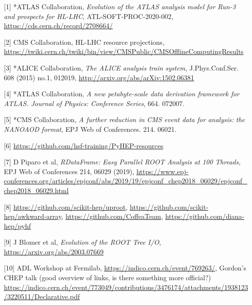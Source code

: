 \documentclass[10pt,a4paper]{article}
\begin{document}

{[}1{]} *ATLAS Collaboration, \emph{Evolution of the ATLAS analysis
model for Run-3 and prospects for HL-LHC}, ATL-SOFT-PROC-2020-002,
\href{https://cds.cern.ch/record/2708664/}{{https://cds.cern.ch/record/2708664/}}

{[}2{]} CMS Collaboration, HL-LHC resource projections,
\href{https://twiki.cern.ch/twiki/bin/view/CMSPublic/CMSOfflineComputingResults}{{https://twiki.cern.ch/twiki/bin/view/CMSPublic/CMSOfflineComputingResults}}

{[}3{]} *ALICE Collaboration, \emph{The ALICE analysis train system},
J.Phys.Conf.Ser. 608 (2015) no.1, 012019,
\href{http://arxiv.org/abs/arXiv:1502.06381}{{http://arxiv.org/abs/arXiv:1502.06381}}

{[}4{]} *ATLAS Collaboration, \emph{A new petabyte-scale data derivation
framework for ATLAS. Journal of Physics: Conference Series}, 664.
072007.

{[}5{]} *CMS Collaboration, \emph{A further reduction in CMS event data
for analysis: the NANOAOD format}, EPJ Web of Conferences. 214. 06021.

{[}6{]}
\href{https://github.com/hsf-training/PyHEP-resources}{{https://github.com/hsf-training/PyHEP-resources}}

{[}7{]} D Piparo et al, \emph{RDataFrame: Easy Parallel ROOT Analysis at
100 Threads}, EPJ Web of Conferences 214, 06029 (2019),
\href{https://www.epj-conferences.org/articles/epjconf/abs/2019/19/epjconf_chep2018_06029/epjconf_chep2018_06029.html}{{https://www.epj-conferences.org/articles/epjconf/abs/2019/19/epjconf\_chep2018\_06029/epjconf\_chep2018\_06029.html}}

{[}8{]}
\href{https://github.com/scikit-hep/uproot}{{https://github.com/scikit-hep/uproot}},
\href{https://github.com/scikit-hep/awkward-array}{{https://github.com/scikit-hep/awkward-array}},
\href{https://github.com/CoffeaTeam}{{https://github.com/CoffeaTeam}},
\href{https://github.com/diana-hep/pyhf}{{https://github.com/diana-hep/pyhf}}

{[}9{]} J Blomer et al, \emph{Evolution of the ROOT Tree I/O},
\href{https://arxiv.org/abs/2003.07669}{{https://arxiv.org/abs/2003.07669}}

{[}10{]} ADL Workshop at Fermilab,
\href{https://indico.cern.ch/event/769263/timetable/?view=standard}{{https://indico.cern.ch/event/769263/}},
Gordon's CHEP talk (good overview of links, is there something more
official?)
\href{https://indico.cern.ch/event/773049/contributions/3476174/attachments/1938123/3220511/Declarative.pdf}{{https://indico.cern.ch/event/773049/contributions/3476174/attachments/1938123/3220511/Declarative.pdf}}
\end{document}
